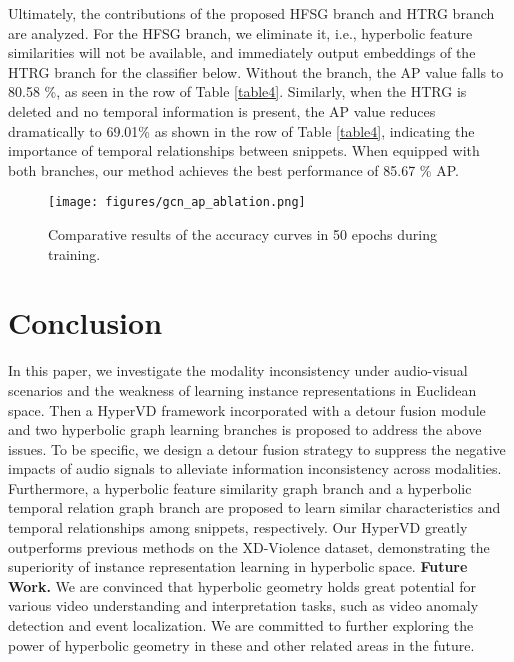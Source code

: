\documentclass[sigconf]{acmart}
\begin{document}
Ultimately, the contributions of the proposed HFSG branch and HTRG branch are analyzed. For the HFSG branch, we eliminate it, i.e., hyperbolic feature similarities will not be available, and immediately output embeddings of the HTRG branch for the classifier below. Without the branch, the AP value falls to 80.58 \%, as seen in the  row of Table \ref{table4}. Similarly, when the HTRG is deleted and no temporal information is present, the AP value reduces dramatically to 69.01\% as shown in the  row of Table \ref{table4}, indicating the importance of temporal relationships between snippets. When equipped with both branches, our method achieves the best performance of 85.67 \% AP.





\begin{figure}[t]
    \centering
\texttt{[image: figures/gcn\_ap\_ablation.png]} \caption{Comparative results of the accuracy curves in 50 epochs during training.}
    \label{fig5}
\end{figure}

\section{Conclusion}
In this paper, we investigate the modality inconsistency under audio-visual scenarios and the weakness of learning instance representations in Euclidean space. Then a HyperVD framework incorporated with a detour fusion module and two hyperbolic graph learning branches is proposed to address the above issues. To be specific, we design a detour fusion strategy to suppress the negative impacts of audio signals to alleviate information inconsistency across modalities. Furthermore, a hyperbolic feature similarity graph branch and a hyperbolic temporal relation graph branch are proposed to learn similar characteristics and temporal relationships among snippets, respectively. Our HyperVD greatly outperforms previous methods on the XD-Violence dataset, demonstrating the superiority of instance representation learning in hyperbolic space.
\noindent\textbf{Future Work.} We are convinced that hyperbolic geometry holds great potential for various video understanding and interpretation tasks, such as video anomaly detection and event localization. We are committed to further exploring the power of hyperbolic geometry in these and other related areas in the future.






\newpage


\end{document}
